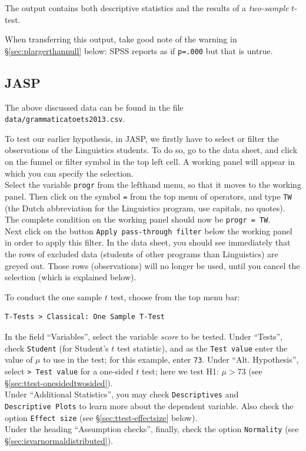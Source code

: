 \documentclass[
]{book}
\begin{document}
The output contains both descriptive statistics and the results
of a \emph{two-sample} \(t\)-test.

When transferring this output, take good note of the warning in
§\ref{sec:plargerthannull} below: SPSS reports as if \texttt{p=.000} but that is untrue.

\hypertarget{sec:jaspttestonesample}{%
\subsection{JASP}\label{sec:jaspttestonesample}}

The above discussed data can be found in the file \texttt{data/grammaticatoets2013.csv}.

To test our earlier hypothesis, in JASP, we firstly have
to select or filter the observations of the Linguistics students. To do so, go to the data sheet, and click on the funnel or filter symbol in the top left cell. A working panel will appear in which you can specify the selection.\\
Select the variable \texttt{progr} from the lefthand menu, so that it moves to the working panel. Then click on the symbol \texttt{=} from the top menu of operators, and type \texttt{TW} (the Dutch abbreviation for the Linguistics program, use capitals, no quotes). The complete condition on the working panel should now be \texttt{progr\ =\ TW}.\\
Next click on the button \texttt{Apply\ pass-through\ filter} below the working panel in order to apply this filter. In the data sheet, you should see immediately that the rows of excluded data (students of other programs than Linguistics) are greyed out. Those rows (observations) will no longer be used, until you cancel the selection (which is explained below).

To conduct the one sample \(t\) test, choose from the top menu bar:

\begin{verbatim}
T-Tests > Classical: One Sample T-Test
\end{verbatim}

In the field ``Variables'', select the variable \emph{score} to be tested.
Under ``Tests'', check \texttt{Student} (for Student's \(t\) test statistic), and as the \texttt{Test\ value} enter the value of \(\mu\) to use in the test; for this example, enter \texttt{73}. Under ``Alt. Hypothesis'', select \texttt{\textgreater{}\ Test\ value} for a one-sided \(t\) test; here we test H1: \(\mu>73\) (see §\ref{sec:ttest-onesidedtwosided}).\\
Under ``Additional Statistics'', you may check \texttt{Descriptives} and \texttt{Descriptive\ Plots} to learn more about the dependent variable. Also check the option \texttt{Effect\ size} (see §\ref{sec:ttest-effectsize} below).\\
Under the heading ``Assumption checks'', finally, check the option \texttt{Normality} (see §\ref{sec:isvarnormaldistributed}).
\end{document}
